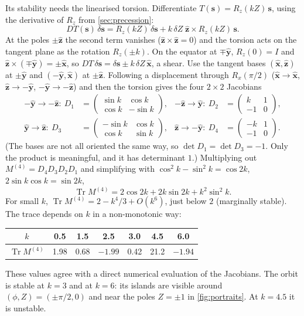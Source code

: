\documentclass[11pt,a4paper]{article}
\newcommand{\vs}{\bm{s}}
\newcommand{\Tr}{\operatorname{Tr}}
\begin{document}
Its stability needs the linearised torsion. Differentiate $T(\vs) = R_z(kZ)\,\vs$, using the derivative of
$R_z$ from \cref{sec:precession}:
\begin{equation*}
  DT(\vs)\,\delta\vs = R_z(kZ)\,\delta\vs + k\,\delta Z\;\hat{\bm z}\times R_z(kZ)\,\vs .
\end{equation*}
At the poles $\pm\hat{\bm z}$ the second term vanishes ($\hat{\bm z}\times\hat{\bm z} = 0$) and the torsion acts on the
tangent plane as the rotation $R_z(\pm k)$. On the equator at $\mp\hat{\bm y}$, $R_z(0) = I$ and $\hat{\bm z}\times
(\mp\hat{\bm y}) = \pm\hat{\bm x}$, so $DT\,\delta\vs = \delta\vs \pm k\,\delta Z\,\hat{\bm x}$, a shear. Use the
tangent bases $(\hat{\bm x}, \hat{\bm z})$ at $\pm\hat{\bm y}$ and $(-\hat{\bm y}, \hat{\bm x})$ at $\pm\hat{\bm z}$.
Following a displacement through $R_x(\pi/2)$ ($\hat{\bm x}\to\hat{\bm x}$, $\hat{\bm z}\to-\hat{\bm y}$, $-\hat{\bm
y}\to-\hat{\bm z}$) and then the torsion gives the four $2\times2$ Jacobians
\begin{align*}
  -\hat{\bm y}\to-\hat{\bm z}:\ D_1 &= \begin{pmatrix}\sin k & \cos k\\ \cos k & -\sin k\end{pmatrix}, &
  -\hat{\bm z}\to\hat{\bm y}:\ D_2 &= \begin{pmatrix}k & 1\\ -1 & 0\end{pmatrix}, \\
  \hat{\bm y}\to\hat{\bm z}:\ D_3 &= \begin{pmatrix}-\sin k & \cos k\\ \cos k & \sin k\end{pmatrix}, &
  \hat{\bm z}\to-\hat{\bm y}:\ D_4 &= \begin{pmatrix}-k & 1\\ -1 & 0\end{pmatrix}.
\end{align*}
(The bases are not all oriented the same way, so $\det D_1 = \det D_3 = -1$. Only the product is meaningful, and it
has determinant $1$.) Multiplying out $M^{(4)} = D_4 D_3 D_2 D_1$ and simplifying with $\cos^2k - \sin^2k = \cos2k$,
$2\sin k\cos k = \sin 2k$,
\begin{equation}\label{eq:period4-trace}
  \boxed{\Tr M^{(4)} = 2\cos 2k + 2k\sin 2k + k^2\sin^2 k .}
\end{equation}
For small $k$, $\Tr M^{(4)} = 2 - k^4/3 + O(k^6)$, just below $2$ (marginally stable). The trace depends on $k$ in a
non-monotonic way:
\begin{center}
\begin{tabular}{ccccccc}
\toprule
$k$ & 0.5 & 1.5 & 2.5 & 3.0 & 4.5 & 6.0\\
\midrule
$\Tr M^{(4)}$ & 1.98 & 0.68 & $-1.99$ & 0.42 & 21.2 & $-1.94$ \\
\bottomrule
\end{tabular}
\end{center}
These values agree with a direct numerical evaluation of the Jacobians. The orbit is stable at $k = 3$ and at $k = 6$:
its islands are visible around $(\phi,Z) = (\pm\pi/2, 0)$ and near the poles $Z = \pm1$ in
\cref{fig:portraits}. At $k = 4.5$ it is unstable.
\end{document}
